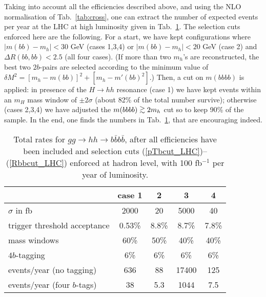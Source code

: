 Taking into account all the efficiencies described above, and using
the NLO normalisation of Tab.~\ref{tab:cross}, one can extract the
number of expected events per year at the LHC at high luminosity given
in Tab.~\ref{tab:rates}.  The selection cuts enforced here are the
following. For a start, we have kept configurations
where $|m(bb)-m_h|<30$ GeV (cases 1,3,4) or
$|m(bb)-m_h|<20$ GeV (case 2) and $\Delta R(bb,bb)<2.5$ (all four cases).
(If more than two $m_h$'s are reconstructed, the best two $2b$-pairs 
are selected according to the minimum value
of $\delta M^2=[m_h-m(bb)]^2+[m_h-m'(bb)^2]$.) Then, a cut on $m(bbbb)$
is applied: in presence of the $H\to hh$ resonance (case 1) we have
kept events within an $m_H$ mass window of $\pm 2\sigma$ (about 82\%
of the total number survive); otherwise
(cases 2,3,4) we have adjusted the $m(bbbb)\OOrd 2m_h$
cut so to keep 90\% of the sample. In the end, one finds
the numbers in Tab.~\ref{tab:rates}, that are encouraging indeed.

\begin{table}[!ht]
\vspace*{-3mm}
\begin{center}
\begin{tabular}{|l||c|c|c|c|} \hline
                             & case 1 & 2     & 3    & 4 \\ \hline
$\sigma$ in fb                    & 2000   & 20    & 5000 & 40 \\
trigger threshold acceptance       &  0.53\%   & 8.8\% & 8.7\%  & 7.8\% \\
mass windows & 60\%   & 50\%  & 40\% & 40\% \\
$4b$-tagging                  & {6\%}  & {6\%} & {6\%}& {6\%} \\ \hline
events/year (no tagging)     &  636  &  88   & 17400  & 125 \\
events/year (four $b$-tags)  &  38   & 5.3   & 1044   & 7.5 \\ \hline
\end{tabular}
\caption{Total rates for $gg\to hh\to b\bar bb\bar b$, 
after all efficiencies have been included and selection
cuts (\ref{pTbcut_LHC})--(\ref{Rbbcut_LHC}) enforced at hadron level,
with 100 fb$^{-1}$ per year of luminosity.}
\label{tab:rates}
\end{center}
\vspace*{-5mm}
\end{table}

